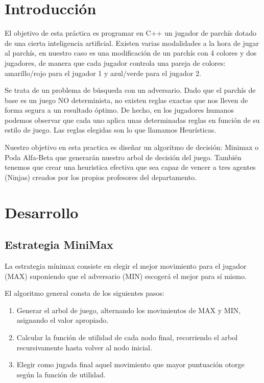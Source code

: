 \documentclass[12pt, spanish]{article}
\begin{document}
\newpage



\tableofcontents
\pagebreak


\section{Introducción}
El objetivo de esta práctica es programar en C++ un jugador de parchís dotado de una
cierta inteligencia artificial. Existen varias modalidades a la hora de jugar al parchís,
en nuestro caso es una modificación de un parchís con 4 colores y dos jugadores, de
manera que cada jugador controla una pareja de colores: amarillo/rojo para el jugador 1 y azul/verde para el jugador 2.

Se trata de un problema de búsqueda con un adversario. Dado que el parchís de base es un juego
NO determinista, no existen reglas exactas que nos lleven de forma segura a un resultado
óptimo. De hecho, en los jugadores humanos podemos observar que cada uno aplica unas determinadas reglas en función de su estilo de juego. Las reglas elegidas son lo que llamamos Heurísticas.

Nuestro objetivo en esta practica es diseñar un algoritmo de decisión: Minimax o Poda Alfa-Beta que generarán nuestro arbol de decisión del juego. También tenemos que crear una heuristica efectiva que sea capaz de vencer a tres agentes (Ninjas) creados por los propios profesores del departamento.

\section{Desarrollo}

\subsection{Estrategia MiniMax}
La estrategia mínimax consiste en elegir el mejor movimiento para el jugador (MAX) suponiendo que el adversario (MIN) escogerá el mejor para sí mismo.

El algoritmo general consta de los siguientes pasos:

\begin{enumerate}
 \item Generar el arbol de juego, alternando los movimientos de MAX y MIN, asignando el valor apropiado.

 \item Calcular la función de utilidad de cada nodo final, recorriendo el arbol recursivamente hasta volver al nodo inicial.

 \item Elegir como jugada final aquel movimiento que mayor puntuación otorge según la función de utilidad.
\end{enumerate}
\end{document}

